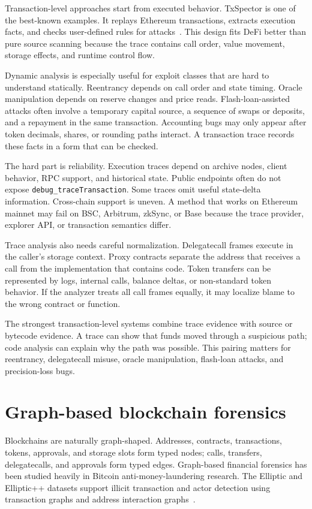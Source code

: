 \documentclass[conference]{IEEEtran}
\begin{document}
Transaction-level approaches start from executed behavior. TxSpector is one of the best-known examples. It replays Ethereum transactions, extracts execution facts, and checks user-defined rules for attacks~\cite{txspector}. This design fits DeFi better than pure source scanning because the trace contains call order, value movement, storage effects, and runtime control flow.

Dynamic analysis is especially useful for exploit classes that are hard to understand statically. Reentrancy depends on call order and state timing. Oracle manipulation depends on reserve changes and price reads. Flash-loan-assisted attacks often involve a temporary capital source, a sequence of swaps or deposits, and a repayment in the same transaction. Accounting bugs may only appear after token decimals, shares, or rounding paths interact. A transaction trace records these facts in a form that can be checked.

The hard part is reliability. Execution traces depend on archive nodes, client behavior, RPC support, and historical state. Public endpoints often do not expose \texttt{debug\_traceTransaction}. Some traces omit useful state-delta information. Cross-chain support is uneven. A method that works on Ethereum mainnet may fail on BSC, Arbitrum, zkSync, or Base because the trace provider, explorer API, or transaction semantics differ.

Trace analysis also needs careful normalization. Delegatecall frames execute in the caller's storage context. Proxy contracts separate the address that receives a call from the implementation that contains code. Token transfers can be represented by logs, internal calls, balance deltas, or non-standard token behavior. If the analyzer treats all call frames equally, it may localize blame to the wrong contract or function.

The strongest transaction-level systems combine trace evidence with source or bytecode evidence. A trace can show that funds moved through a suspicious path; code analysis can explain why the path was possible. This pairing matters for reentrancy, delegatecall misuse, oracle manipulation, flash-loan attacks, and precision-loss bugs.

\section{Graph-based blockchain forensics}

Blockchains are naturally graph-shaped. Addresses, contracts, transactions, tokens, approvals, and storage slots form typed nodes; calls, transfers, delegatecalls, and approvals form typed edges. Graph-based financial forensics has been studied heavily in Bitcoin anti-money-laundering research. The Elliptic and Elliptic++ datasets support illicit transaction and actor detection using transaction graphs and address interaction graphs~\cite{elliptic,ellipticpp}.
\end{document}
